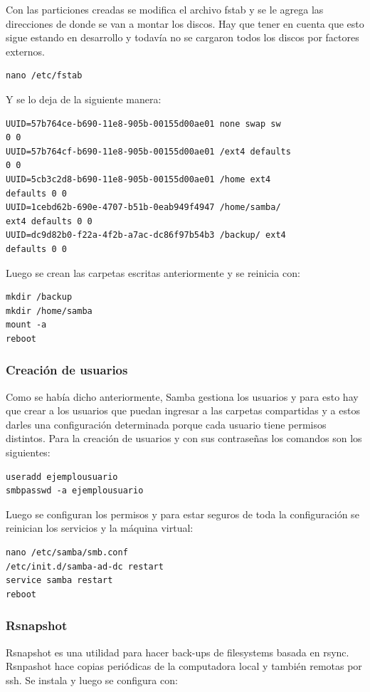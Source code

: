 \documentclass[12pt,a4paper]{article}
\begin{document}
Con las particiones creadas se modifica el archivo fstab y se le agrega las direcciones de donde se van a montar los discos. Hay que tener en cuenta que esto sigue estando en desarrollo y todavía no se cargaron todos los discos por factores externos.

\begin{lstlisting}
nano /etc/fstab
\end{lstlisting}

Y se lo deja de la siguiente manera:

\begin{lstlisting}
UUID=57b764ce-b690-11e8-905b-00155d00ae01 none swap sw 
0 0
UUID=57b764cf-b690-11e8-905b-00155d00ae01 /ext4 defaults 
0 0
UUID=5cb3c2d8-b690-11e8-905b-00155d00ae01 /home ext4 
defaults 0 0
UUID=1cebd62b-690e-4707-b51b-0eab949f4947 /home/samba/ 
ext4 defaults 0 0
UUID=dc9d82b0-f22a-4f2b-a7ac-dc86f97b54b3 /backup/ ext4 
defaults 0 0
\end{lstlisting}

Luego se crean las carpetas escritas anteriormente y se reinicia con:

\begin{lstlisting}
mkdir /backup
mkdir /home/samba
mount -a
reboot
\end{lstlisting}

\subsubsection{Creación de usuarios}
Como se había dicho anteriormente, Samba gestiona los usuarios y para esto hay que crear a los usuarios que puedan ingresar a las carpetas compartidas y a estos darles una configuración determinada porque cada usuario tiene permisos distintos. Para la creación de usuarios y con sus contraseñas los comandos son los siguientes:

\begin{lstlisting}
useradd ejemplousuario
smbpasswd -a ejemplousuario
\end{lstlisting}

Luego se configuran los permisos y para estar seguros de toda la configuración se reinician los servicios y la máquina virtual: 

\begin{lstlisting}
nano /etc/samba/smb.conf
/etc/init.d/samba-ad-dc restart
service samba restart
reboot 
\end{lstlisting}

\subsubsection{Rsnapshot}
Rsnapshot es una utilidad para hacer back-ups de filesystems basada en rsync. Rsnpashot hace copias periódicas de la computadora local y también remotas por ssh. Se instala y luego se configura con: 
\end{document}
